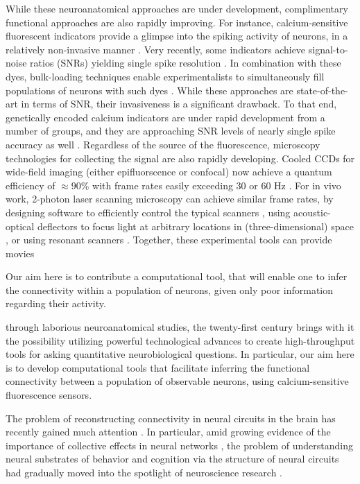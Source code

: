 While these neuroanatomical approaches are under development, complimentary functional approaches are also rapidly improving.  For instance, calcium-sensitive fluorescent indicators provide a glimpse into the spiking activity of neurons, in a relatively non-invasive manner \cite{Tsien89}. Very recently, some indicators achieve signal-to-noise ratios (SNRs) yielding single spike resolution \cite{??}.  In combination with these dyes, bulk-loading techniques enable experimentalists to simultaneously fill populations of neurons with such dyes \cite{??}.  While these approaches are state-of-the-art in terms of SNR, their invasiveness is a significant drawback.  To that end, genetically encoded calcium indicators are under rapid development from a number of groups, and they are approaching SNR levels of nearly single spike accuracy as well \cite{??}. Regardless of the source of the fluorescence, microscopy technologies for collecting the signal are also rapidly developing.  Cooled CCDs for wide-field imaging (either epifluorscence or confocal) now achieve a quantum efficiency of $\approx 90 \%$ with frame rates easily exceeding $30$ or $60$ Hz \cite{redshirt}.  For in vivo work, 2-photon laser scanning microscopy can achieve similar frame rates, by designing software to efficiently control the typical scanners \cite{??}, using acoustic-optical deflectors to focus light at arbitrary locations in (three-dimensional) space \cite{??}, or using resonant scanners \cite{??}.  Together, these experimental tools can provide movies 





Our aim here is to contribute a computational tool, that will enable one to infer the connectivity within a population of neurons, given only poor information regarding their activity.  





 through laborious neuroanatomical studies, the twenty-first century brings with it the possibility utilizing powerful technological advances to create high-throughput tools for asking quantitative neurobiological questions.  In particular, our aim here is to develop computational tools that facilitate inferring the functional connectivity between a population of observable neurons, using calcium-sensitive fluorescence sensors.

The problem of reconstructing connectivity in neural circuits in the brain has recently gained much attention \cite{Hagmann2008, Hagmann2007, Helmstaedter2009, DenkHorstmann04, Briggman2006, Ikegaya2005}. In particular, amid growing evidence of the importance of collective effects in neural networks \cite{Rabinovich2008, Broome2006, Jones2007}, the problem of understanding neural substrates of behavior and cognition via the structure of neural circuits had gradually moved into the spotlight of neuroscience research \cite{Averbeck2008, deBono2005, Song2005, Dunn2004, Chalasani2007, Gray2005, rswormatlas, White1986}.

